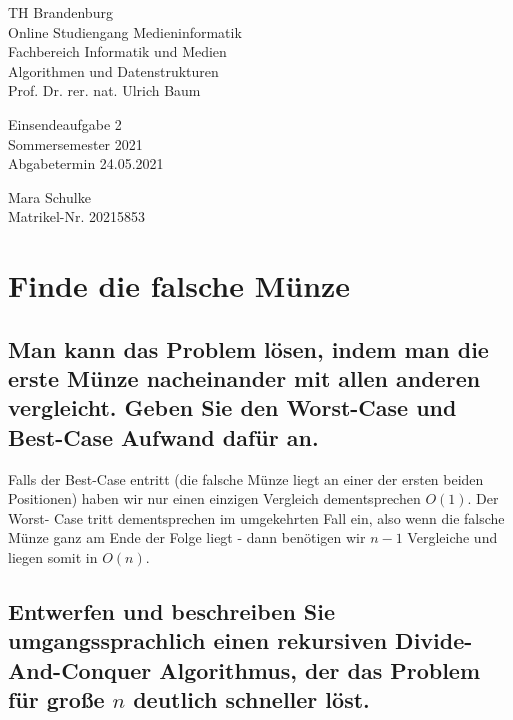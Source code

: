 \documentclass{article}
\begin{document}
\begin{titlepage}
	\begin{flushleft}
		TH Brandenburg \\
		Online Studiengang Medieninformatik \\
		Fachbereich Informatik und Medien \\
		Algorithmen und Datenstrukturen \\
		Prof. Dr. rer. nat. Ulrich Baum
	\end{flushleft}

	\vfill

	\begin{center}
		\Large{Einsendeaufgabe 2}\\[0.5em]
		\large{Sommersemester 2021}\\[0.25em]
		\large{Abgabetermin 24.05.2021}
	\end{center}

	\vfill

	\begin{flushright}
		Mara Schulke \\
		Matrikel-Nr. 20215853
	\end{flushright}
\end{titlepage}

\newpage

\section{Finde die falsche Münze}

\subsection{Man kann das Problem lösen, indem man die erste Münze nacheinander
mit allen anderen vergleicht. Geben Sie den Worst-Case und Best-Case Aufwand
dafür an.}

Falls der Best-Case entritt (die falsche Münze liegt an einer der ersten beiden
Positionen) haben wir nur einen einzigen Vergleich dementsprechen $O(1)$. Der
Worst- Case tritt dementsprechen im umgekehrten Fall ein, also wenn die falsche
Münze ganz am Ende der Folge liegt - dann benötigen wir $n - 1$ Vergleiche und
liegen somit in $O(n)$.

\subsection{Entwerfen und beschreiben Sie umgangssprachlich einen rekursiven
Divide-And-Conquer Algorithmus, der das Problem für große $n$ deutlich
schneller löst.}
\end{document}
